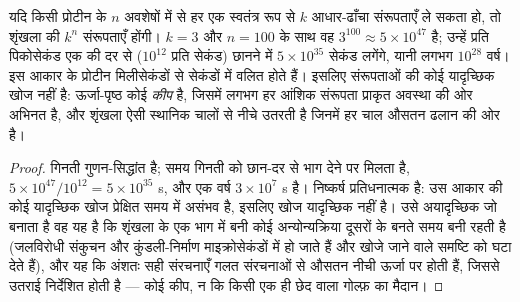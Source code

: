 \begin{theorem}[लेविंथल का विरोधाभास]\label{thm:b3:structural-biology:levinthal}
यदि किसी प्रोटीन के $n$ अवशेषों में से हर एक स्वतंत्र रूप से $k$
आधार-ढाँचा संरूपताएँ ले सकता हो, तो शृंखला की $k^{n}$
संरूपताएँ होंगी। $k = 3$ और $n = 100$ के साथ वह $3^{100} \approx
5\times 10^{47}$ है; उन्हें प्रति पिकोसेकंड एक की दर से ($10^{12}$ प्रति
सेकंड) छानने में $5\times 10^{35}$ सेकंड लगेंगे, यानी लगभग $10^{28}$
वर्ष। इस आकार के प्रोटीन मिलीसेकंडों से सेकंडों में वलित होते हैं।
इसलिए  संरूपताओं की कोई यादृच्छिक खोज नहीं है: ऊर्जा-पृष्ठ कोई
\emph{कीप} है, जिसमें लगभग हर आंशिक संरूपता प्राकृत अवस्था की ओर अभिनत
है, और शृंखला ऐसी स्थानिक चालों से नीचे उतरती है जिनमें हर चाल औसतन
ढलान की ओर है।
\end{theorem}
\begin{proof}
गिनती गुणन-सिद्धांत है; समय गिनती को छान-दर से भाग देने पर मिलता है,
$5\times 10^{47}/10^{12} = 5\times
10^{35}$ s, और एक वर्ष $3\times 10^{7}$ s है। निष्कर्ष प्रतिधनात्मक है:
उस आकार की कोई यादृच्छिक खोज प्रेक्षित समय में असंभव है, इसलिए खोज
यादृच्छिक नहीं है। उसे अयादृच्छिक जो बनाता है वह यह है कि शृंखला के एक
भाग में बनी कोई अन्योन्यक्रिया दूसरों के बनते समय बनी रहती है
(जलविरोधी संकुचन और कुंडली-निर्माण माइक्रोसेकंडों में हो जाते हैं और
खोजे जाने वाले समष्टि को घटा देते हैं), और यह कि अंशतः सही संरचनाएँ
गलत संरचनाओं से औसतन नीची ऊर्जा पर होती हैं, जिससे उतराई निर्देशित होती
है --- कोई कीप, न कि किसी एक ही छेद वाला गोल्फ़ का मैदान।
\end{proof}

